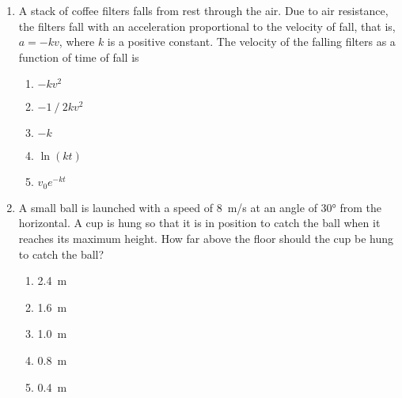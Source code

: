 \documentclass{../../oss-apphys}
\begin{document}
\begin{multicols}{2}
\begin{enumerate}[resume,leftmargin=18pt]

    \begin{enumerate}[noitemsep,topsep=0pt,leftmargin=18pt,label=(\Alph*)]
    \item\SI{2}{\second}
    \item\SI{4}{\second}
    \item\SI{6}{\second}
    \item\SI{9}{\second}
    \item\SI{10}{\second}
    \end{enumerate}

  \item A stack of coffee filters falls from rest through the air. Due to air
    resistance, the filters fall with an acceleration proportional to the
    velocity of fall, that is, $a=-kv$, where $k$ is a positive constant. The
    velocity of the falling filters as a function of time of fall is
    \begin{enumerate}[noitemsep,topsep=0pt,leftmargin=18pt,label=(\Alph*)]
    \item $-kv^2$
    \item $-1⁄2kv^2$
    \item $-k$
    \item $\ln(kt)$
    \item $v_0e^{-kt}$
    \end{enumerate}
    
    \columnbreak
    
  \item A small ball is launched with a speed of \SI{8}{m/s} at an angle of
    \ang{30} from the horizontal. A cup is hung so that it is in position to
    catch the ball when it reaches its maximum height. How far above the floor
    should the cup be hung to catch the ball?
    

    \begin{enumerate}[noitemsep,topsep=0pt,leftmargin=18pt,label=(\Alph*)]
    \item\SI{2.4}{\metre}
    \item\SI{1.6}{\metre}
    \item\SI{1.0}{\metre}
    \item\SI{.8}{\metre}
    \item\SI{.4}{\metre}
    \end{enumerate}
  \end{enumerate}
  

\end{multicols}
\end{document}
